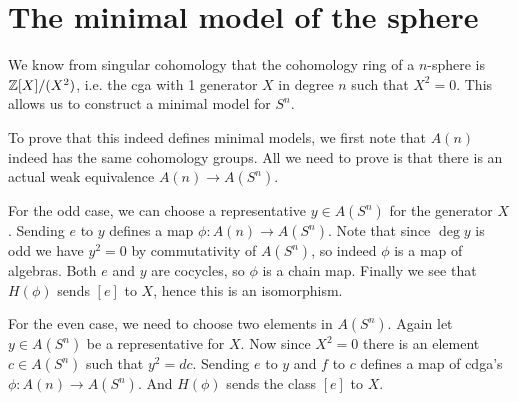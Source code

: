 

\section{The minimal model of the sphere}
We know from singular cohomology that the cohomology ring of a $n$-sphere is $\mathbb{Z}[X] / (X^2)$, i.e. the cga with 1 generator $X$ in degree $n$ such that $X^2 = 0$. This allows us to construct a minimal model for $S^n$.

To prove that this indeed defines minimal models, we first note that $A(n)$ indeed has the same cohomology groups. All we need to prove is that there is an actual  weak equivalence $A(n) \to A(S^n)$.

For the odd case, we can choose a representative $y \in A(S^n)$ for the generator $X$. Sending $e$ to $y$ defines a map $\phi: A(n) \to A(S^n)$. Note that since $\deg{y}$ is odd we have $y^2 = 0$ by commutativity of $A(S^n)$, so indeed $\phi$ is a map of algebras. Both $e$ and $y$ are cocycles, so $\phi$ is a chain map. Finally we see that $H(\phi)$ sends $[e]$ to $X$, hence this is an isomorphism.

For the even case, we need to choose two elements in $A(S^n)$. Again let $y \in A(S^n)$ be a representative for $X$. Now since $X^2 = 0$ there is an element $c \in A(S^n)$ such that $y^2 = d c$. Sending $e$ to $y$ and $f$ to $c$ defines a map of cdga's $\phi : A(n) \to A(S^n)$. And $H(\phi)$ sends the class $[e]$ to $X$.
